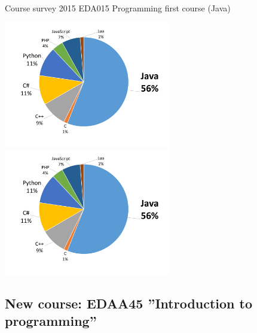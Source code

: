 \documentclass{lecturenotes}
\begin{document}
\begin{Slide}{Course survey 2015 EDA015 Programming first course (Java)}
\begin{multicols}{2}
{\includegraphics[width=0.55\textwidth]{lang-2015}}
\columnbreak
{\includegraphics[width=0.55\textwidth]{lang-2015}}
\end{multicols}
\end{Slide}


\subsection[New course: EDAA45 ''Introduction to programming'']{New course: EDAA45 ''Introduction to programming''}
\end{document}
